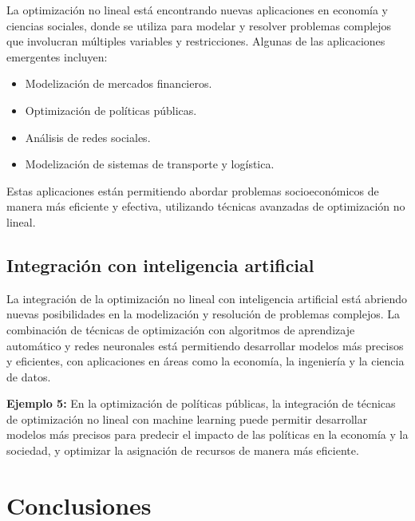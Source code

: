 \begin{flushleft}
	La optimización no lineal está encontrando nuevas aplicaciones en economía y ciencias sociales, donde se utiliza para modelar y resolver problemas complejos que involucran múltiples variables y restricciones. Algunas de las aplicaciones emergentes incluyen:
\end{flushleft}

\begin{itemize}
	\item Modelización de mercados financieros.
	\item Optimización de políticas públicas.
	\item Análisis de redes sociales.
	\item Modelización de sistemas de transporte y logística.
\end{itemize}

\begin{flushleft}
	Estas aplicaciones están permitiendo abordar problemas socioeconómicos de manera más eficiente y efectiva, utilizando técnicas avanzadas de optimización no lineal.
\end{flushleft}

\subsection{Integración con inteligencia artificial}

\begin{flushleft}
	La integración de la optimización no lineal con inteligencia artificial está abriendo nuevas posibilidades en la modelización y resolución de problemas complejos. La combinación de técnicas de optimización con algoritmos de aprendizaje automático y redes neuronales está permitiendo desarrollar modelos más precisos y eficientes, con aplicaciones en áreas como la economía, la ingeniería y la ciencia de datos.
\end{flushleft}

\begin{flushleft}
	\textbf{Ejemplo 5:} En la optimización de políticas públicas, la integración de técnicas de optimización no lineal con machine learning puede permitir desarrollar modelos más precisos para predecir el impacto de las políticas en la economía y la sociedad, y optimizar la asignación de recursos de manera más eficiente.
\end{flushleft}
\section{Conclusiones}

